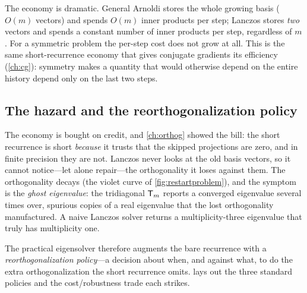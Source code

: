 The economy is dramatic. General Arnoldi stores the whole growing basis ($O(m)$ vectors) and
spends $O(m)$ inner products per step; Lanczos stores \emph{two} vectors and spends a constant
number of inner products per step, regardless of $m$. For a symmetric problem the per-step cost
does not grow at all. This is the same short-recurrence economy that gives conjugate gradients its
efficiency (\cref{ch:cg}): symmetry makes a quantity that would otherwise depend on the entire
history depend only on the last two steps.

\subsection{The hazard and the reorthogonalization policy}

The economy is bought on credit, and \cref{ch:orthog} showed the bill: the short recurrence is
short \emph{because} it trusts that the skipped projections are zero, and in finite precision they
are not. Lanczos never looks at the old basis vectors, so it cannot notice---let alone
repair---the orthogonality it loses against them. The orthogonality decays (the violet curve of
\cref{fig:restartproblem}), and the symptom is the \emph{ghost eigenvalue}: the tridiagonal
$\mathsf{T}_m$ reports a converged eigenvalue several times over, spurious copies of a real eigenvalue
that the lost orthogonality manufactured. A naive Lanczos solver returns a multiplicity-three
eigenvalue that truly has multiplicity one.

The practical eigensolver therefore augments the bare recurrence with a \emph{reorthogonalization
policy}---a decision about when, and against what, to do the extra orthogonalization the short
recurrence omits.  lays out the three standard policies and the cost/robustness
trade each strikes.

